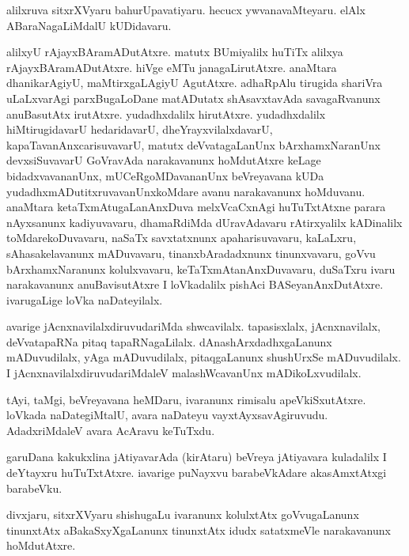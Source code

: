 \documentclass{article}
\begin{document}
\begin{mng}%
alilxruva sitxrXVyaru bahurUpavatiyaru. hecucx ywvanavaMteyaru. elAlx ABaraNagaLiMdalU kUDidavaru.
\end{mng}

\begin{mng}%
alilxyU rAjayxBAramADutAtxre. matutx BUmiyalilx huTiTx alilxya rAjayxBAramADutAtxre. hiVge eMTu 
janagaLirutAtxre. anaMtara dhanikarAgiyU, maMtirxgaLAgiyU AgutAtxre. adhaRpAlu tirugida shariVra 
uLaLxvarAgi parxBugaLoDane matADutatx shAsavxtavAda savagaRvanunx anuBasutAtx irutAtxre. 
yudadhxdalilx hirutAtxre. yudadhxdalilx hiMtirugidavarU hedaridavarU, dheYrayxvilalxdavarU, 
kapaTavanAnxcarisuvavarU, matutx deVvatagaLanUnx bArxhamxNaranUnx devxsiSuvavarU GoVravAda 
narakavanunx hoMdutAtxre keLage bidadxvavananUnx, mUCeRgoMDavananUnx beVreyavana kUDa 
yudadhxmADutitxruvavanUnxkoMdare avanu narakavanunx hoMduvanu. anaMtara ketaTxmAtugaLanAnxDuva 
melxVcaCxnAgi huTuTxtAtxne parara nAyxsanunx kadiyuvavaru, dhamaRdiMda dUravAdavaru rAtirxyalilx 
kADinalilx toMdarekoDuvavaru, naSaTx savxtatxnunx apaharisuvavaru, kaLaLxru, sAhasakelavanunx 
mADuvavaru, tinanxbAradadxnunx tinunxvavaru, goVvu bArxhamxNaranunx kolulxvavaru, 
keTaTxmAtanAnxDuvavaru, duSaTxru ivaru narakavanunx anuBavisutAtxre I loVkadalilx pishAci 
BASeyanAnxDutAtxre. ivarugaLige loVka naDateyilalx.
\end{mng}

\begin{mng}%
avarige jAcnxnavilalxdiruvudariMda shwcavilalx. tapasisxlalx, jAcnxnavilalx, deVvatapaRNa pitaq	
tapaRNagaLilalx. dAnashArxdadhxgaLanunx mADuvudilalx, yAga mADuvudilalx, pitaqgaLanunx shushUrxSe 
mADuvudilalx. I jAcnxnavilalxdiruvudariMdaleV malashWcavanUnx mADikoLxvudilalx.
\end{mng}

\begin{mng}%
tAyi, taMgi, beVreyavana heMDaru, ivaranunx rimisalu apeVkiSxutAtxre. loVkada naDategiMtalU, avara 
naDateyu vayxtAyxsavAgiruvudu. AdadxriMdaleV avara AcAravu keTuTxdu.
\end{mng}

\begin{mng}%
garuDana kakukxlina jAtiyavarAda (kirAtaru) beVreya jAtiyavara kuladalilx I deYtayxru huTuTxtAtxre. 
iavarige puNayxvu barabeVkAdare akasAmxtAtxgi barabeVku.
\end{mng}

\begin{mng}%
divxjaru, sitxrXVyaru shishugaLu ivaranunx kolulxtAtx goVvugaLanunx tinunxtAtx aBakaSxyXgaLanunx 
tinunxtAtx idudx satatxmeVle narakavanunx hoMdutAtxre.
\end{mng}
\end{document}

